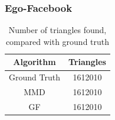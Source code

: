 \documentclass[a4paper,11pt, twoside]{article}
\begin{document}
            
    	\subsubsection{Ego-Facebook}
            \begin{table}[h!]
                    \centering
            	\small
            	\begin{tabular}{cc}
            		\toprule
            		\textbf{Algorithm}  & \textbf{Triangles} \\
            		\midrule
            		Ground Truth   & 1612010  \\
            		MMD            & 1612010  \\
            		GF    & 1612010  \\
            		\bottomrule
            	\end{tabular}
                    \label{tab:triangles}
                    \caption{Number of triangles found, compared with ground truth}
            \end{table}
    
\end{document}
